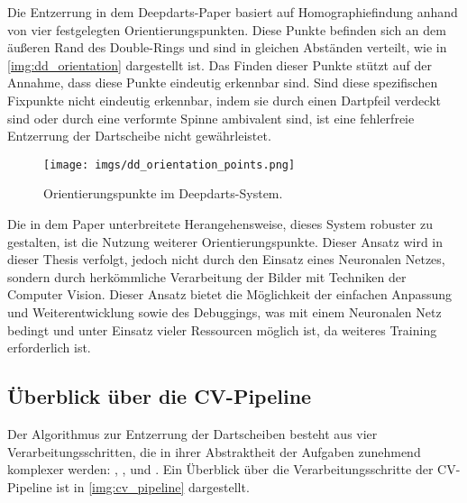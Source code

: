 Die Entzerrung in dem Deepdarts-Paper basiert auf Homographiefindung anhand von vier festgelegten Orientierungspunkten. Diese Punkte befinden sich an dem äußeren Rand des Double-Rings und sind in gleichen Abständen verteilt, wie in \autoref{img:dd_orientation} dargestellt ist. Das Finden dieser Punkte stützt auf der Annahme, dass diese Punkte eindeutig erkennbar sind. Sind diese spezifischen Fixpunkte nicht eindeutig erkennbar, indem sie durch einen Dartpfeil verdeckt sind oder durch eine verformte Spinne ambivalent sind, ist eine fehlerfreie Entzerrung der Dartscheibe nicht gewährleistet.

\begin{figure}
    \centering
    \texttt{[image: imgs/dd\_orientation\_points.png]}
    \caption{Orientierungspunkte im Deepdarts-System. \cite{deepdarts}}
    \label{img:dd_orientation}
\end{figure}

Die in dem Paper unterbreitete Herangehensweise, dieses System robuster zu gestalten, ist die Nutzung weiterer Orientierungspunkte. Dieser Ansatz wird in dieser Thesis verfolgt, jedoch nicht durch den Einsatz eines Neuronalen Netzes, sondern durch herkömmliche Verarbeitung der Bilder mit Techniken der Computer Vision. Dieser Ansatz bietet die Möglichkeit der einfachen Anpassung und Weiterentwicklung sowie des Debuggings, was mit einem Neuronalen Netz bedingt und unter Einsatz vieler Ressourcen möglich ist, da weiteres Training erforderlich ist.



\subsection{Überblick über die CV-Pipeline}
\label{sec:impl:cv:pipeline}

Der Algorithmus zur Entzerrung der Dartscheiben besteht aus vier Verarbeitungsschritten, die in ihrer Abstraktheit der Aufgaben zunehmend komplexer werden: , ,  und . Ein Überblick über die Verarbeitungsschritte der CV-Pipeline ist in \autoref{img:cv_pipeline} dargestellt.

